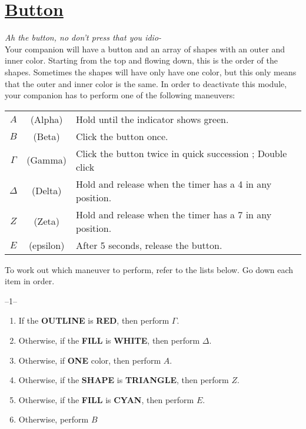 \documentclass[letterpaper,12pt]{report}
\begin{document}
\section*{\underline{Button}}
\textit{Ah the button, no don't press that you idio-}\\[1cm]
Your companion will have a button and an array of shapes with an outer and inner color. Starting from the top and flowing down, this is the order of the shapes.
Sometimes the shapes will have only have one color, but this only means that the outer and inner color is the same.
In order to deactivate this module, your companion has to perform one of the following maneuvers:
\renewcommand{\arraystretch}{2}
\begin{center}
  \begin{tabular}{|cc|l|}
    \hline
    $A$      & (Alpha)   & Hold until the indicator shows green.                     \\
    $B$      & (Beta)    & Click the button once.                                    \\
    $\Gamma$ & (Gamma)   & Click the button twice in quick succession ; Double click \\
    $\Delta$ & (Delta)   & Hold and release when the timer has a 4 in any position.  \\
    $Z$      & (Zeta)    & Hold and release when the timer has a 7 in any position.  \\
    $E$      & (epsilon) & After 5 seconds, release the button.                      \\
    \hline
  \end{tabular}
  \renewcommand{\arraystretch}{1}
\end{center}
To work out which maneuver to perform, refer to the lists below. Go down each item in order.
\begin{center}
  --1--
  \begin{enumerate}
    \item If the \textbf{OUTLINE} is \textbf{RED}, then perform $\Gamma$.
    \item Otherwise, if the \textbf{FILL} is \textbf{WHITE}, then perform $\Delta$.
    \item Otherwise, if \textbf{ONE} color, then perform $A$.
    \item Otherwise, if the \textbf{SHAPE} is \textbf{TRIANGLE}, then perform $Z$.
    \item Otherwise, if the \textbf{FILL} is \textbf{CYAN}, then perform $E$.
    \item Otherwise, perform $B$
  \end{enumerate}
\end{center}
\end{document}
